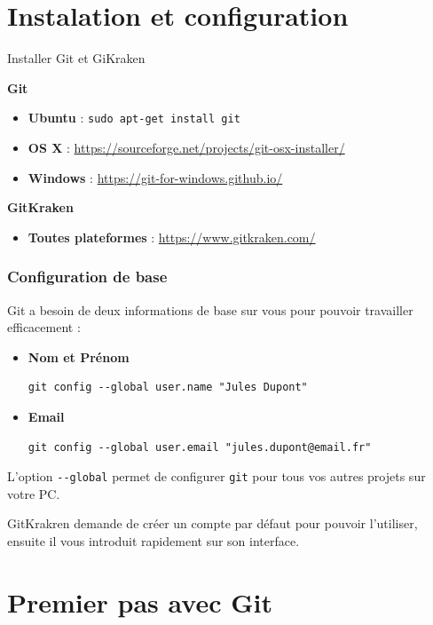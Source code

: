 \documentclass{beamer}
\begin{document}
\section{Instalation et configuration}
\begin{frame}{Installer Git et GiKraken}

\textbf{Git}
\begin{itemize}
\item \textbf{Ubuntu} : \lstinline{sudo apt-get install git}
\item \textbf{OS X} : \url{https://sourceforge.net/projects/git-osx-installer/}
\item \textbf{Windows} : \url{https://git-for-windows.github.io/}
\end{itemize}

\textbf{GitKraken}
\begin{itemize}
\item \textbf{Toutes plateformes} : \url{https://www.gitkraken.com/}
\end{itemize}
\end{frame}

\begin{frame}[fragile]
\frametitle{Configuration de base}

Git a besoin de deux informations de base sur vous pour pouvoir travailler efficacement :

\begin{itemize}
\item \textbf{Nom et Prénom}
\begin{lstlisting}
git config --global user.name "Jules Dupont"
\end{lstlisting}

\item \textbf{Email}
\begin{lstlisting}
git config --global user.email "jules.dupont@email.fr"
\end{lstlisting}
\end{itemize}

L'option \lstinline{--global} permet de configurer \texttt{git} pour tous vos autres projets sur votre PC.

GitKrakren demande de créer un compte par défaut pour pouvoir l'utiliser, ensuite il vous introduit rapidement sur son interface.
\end{frame}

\section{Premier pas avec Git}
\end{document}

